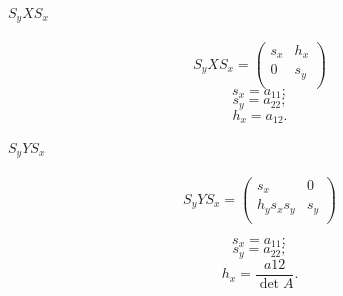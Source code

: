 \paragraph{$S_yXS_x$}
$$S_yXS_x = \begin{pmatrix} s_x & h_x \\ 0 & s_y \\ \end{pmatrix} $$
$$s_x = a_{11};$$
$$s_y = a_{22};$$
$$h_x = a_{12}.$$

\paragraph{$S_yYS_x$}
$$S_yYS_x = \begin{pmatrix} s_x & 0 \\ h_y s_x s_y & s_y \\ \end{pmatrix} $$ 

$$s_x = a_{11};$$
$$s_y = a_{22};$$
$$h_x = \frac{a{12}}{\det A}.$$

